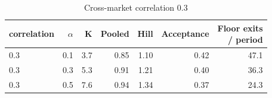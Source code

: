 \begin{table}[htbp]
\centering
\caption{Cross-market correlation 0.3}
\label{tab:a11b_correlation}
\small
\begin{tabular}{lrrrrrr}
\toprule
correlation & $\alpha$ & K & Pooled & Hill & Acceptance & \makecell[b]{Floor exits\\{}/ period} \\
\midrule
0.3 & 0.1 & 3.7 & 0.85 & 1.10 & 0.42 & 47.1 \\
0.3 & 0.3 & 5.3 & 0.91 & 1.21 & 0.40 & 36.3 \\
0.3 & 0.5 & 7.6 & 0.94 & 1.34 & 0.37 & 24.3 \\
\bottomrule
\end{tabular}
\end{table}
